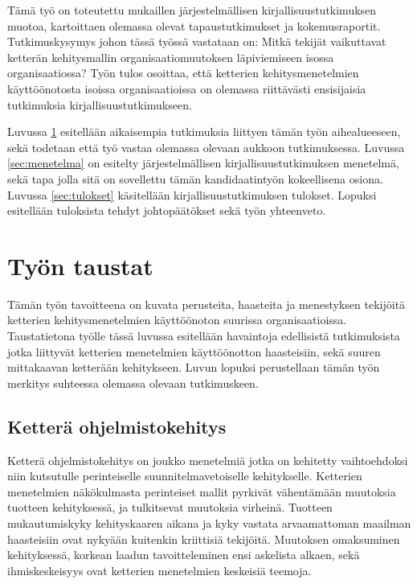 Tämä työ on toteutettu mukaillen järjestelmällisen kirjallisuustutkimuksen
muotoa, kartoittaen olemassa olevat tapaustutkimukset ja kokemusraportit.
Tutkimuskysymys johon tässä työssä vastataan on: Mitkä tekijät vaikuttavat
ketterän kehitysmallin organisaatiomuutoksen läpiviemiseen isossa
organisaatiossa? Työn tulos osoittaa, että ketterien kehitysmenetelmien
käyttöönotosta isoissa organisaatioissa on olemassa riittävästi ensisijaisia
tutkimuksia kirjallisuustutkimukseen.

Luvussa \ref{sec:tausta} esitellään aikaisempia tutkimuksia liittyen tämän työn
aihealueeseen, sekä todetaan että työ vastaa olemassa olevaan aukkoon
tutkimuksessa. Luvussa \ref{sec:menetelma} on esitelty järjestelmällisen
kirjallisuustutkimuksen menetelmä, sekä tapa jolla sitä on sovellettu tämän
kandidaatintyön kokeellisena osiona. Luvussa \ref{sec:tulokset} käsitellään
kirjallisuustutkimuksen tulokset. Lopuksi esitellään tuloksista tehdyt
johtopäätökset sekä työn yhteenveto.



\section{Työn taustat}
\label{sec:tausta}

Tämän työn tavoitteena on kuvata perusteita, haasteita ja menestyksen tekijöitä
ketterien kehitysmenetelmien käyttöönoton suurissa organisaatioissa.
Taustatietona työlle tässä luvussa esitellään havaintoja edellisistä
tutkimuksista jotka liittyvät ketterien menetelmien käyttöönotton haasteisiin,
sekä suuren mittakaavan ketterään kehitykseen. Luvun lopuksi perustellaan tämän
työn merkitys suhteessa olemassa olevaan tutkimuskeen.

\subsection{Ketterä ohjelmistokehitys}

Ketterä ohjelmistokehitys on joukko menetelmiä jotka on kehitetty vaihtoehdoksi
niin kutsutulle perinteiselle suunnitelmavetoiselle kehitykselle. Ketterien
menetelmien näkökulmasta perinteiset mallit pyrkivät vähentämään muutoksia
tuotteen kehityksessä, ja tulkitsevat muutoksia virheinä. Tuotteen
mukautumiskyky kehityskaaren aikana ja kyky vastata arvaamattoman maailman
haasteisiin ovat nykyään kuitenkin kriittisiä tekijöitä. Muutoksen omaksuminen
kehityksessä, korkean laadun tavoitteleminen ensi askelista alkaen, sekä
ihmiskeskeisyys ovat ketterien menetelmien keskeisiä teemoja.

